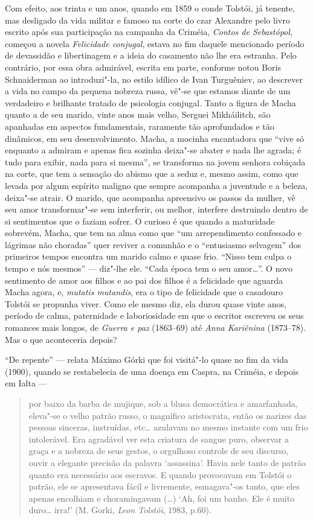 Com efeito, aos trinta e um anos, quando em 1859 o conde Tolstói,
já tenente, mas desligado da vida militar e famoso na corte do czar
Alexandre  pelo livro escrito após sua participação na campanha da
Criméia, \emph{Contos de Sebastópol}, começou a novela \emph{Felicidade
conjugal}, estava no fim daquele mencionado período de devassidão e
libertinagem e a ideia do casamento não lhe era estranha. Pelo
contrário, por essa obra admirável, escrita em parte, conforme notou
Boris Schnaiderman ao introduzi"-la, no estilo idílico de Ivan Turguêniev,
ao descrever a vida no campo da pequena nobreza russa, vê"-se que estamos
diante de um verdadeiro e brilhante tratado de psicologia conjugal.
Tanto a figura de Macha quanto a de seu marido, vinte anos mais velho,
Serguei Mikháilitch, são apanhadas em aspectos fundamentais,
raramente tão aprofundados e tão dinâmicos, em seu desenvolvimento.
Macha, a mocinha encantadora que ``vive só enquanto a admiram e apenas
fica sozinha deixa"-se abater e nada lhe agrada; é tudo para exibir, nada
para si mesma'', se transforma na jovem senhora cobiçada na corte, que
tem a sensação do abismo que a seduz e, mesmo assim, como que levada
por algum espírito maligno que sempre acompanha a juventude e a beleza,
deixa"-se atrair. O marido, que acompanha apreensivo os passos da mulher,
vê seu amor transformar"-se sem interferir, ou melhor, interfere
destruindo dentro de si sentimentos que o faziam sofrer. O curioso é que
quando a maturidade sobrevém, Macha, que tem na alma como que ``um
arrependimento confessado e lágrimas não choradas'' quer reviver a
comunhão e o ``entusiasmo selvagem'' dos primeiros
tempos encontra um marido calmo e quase frio. ``Nisso tem culpa o
tempo e nós mesmos'' --- diz"-lhe ele. ``Cada época tem o seu amor\ldots{}''. O
novo sentimento de amor aos filhos e ao pai dos filhos é a
felicidade que aguarda Macha agora, e, \emph{mutatis mutandis}, era o
tipo de felicidade que o casadouro Tolstói se propunha viver. Como ele
mesmo diz, ela durou quase vinte anos, período de calma, paternidade e
laboriosidade em que o escritor escreveu os seus romances mais longos,
de \emph{Guerra e paz} (1863--69) até \emph{Anna Kariênina} (1873--78).
Mas o que aconteceria depois?

``De repente'' --- relata Máximo Górki que foi visitá"-lo quase no fim
da vida (1900)\emph{,} quando se restabelecia de uma doença em Caspra,
na Criméia, e depois em Ialta ---

\begin{quote}
por baixo da barba de
mujique, sob a blusa democrática e amarfanhada, eleva"-se o velho patrão
russo, o magnífico aristocrata, então os narizes das pessoas sinceras,
instruídas, etc\ldots{} azulavam no mesmo instante com um frio intolerável.
Era agradável ver esta criatura de sangue puro, observar a graça e a
nobreza de seus gestos, o orgulhoso controle de seu discurso, ouvir a
elegante precisão da palavra `assassina'. Havia nele tanto de patrão
quanto era necessário aos escravos. E quando provocavam em Tolstói o
patrão, ele se apresentava fácil e livremente, esmagava"-os tanto, que
eles apenas encolhiam e choramingavam (\ldots{}) `Ah, foi um banho. Ele é
muito duro\ldots{} irra!' (M. Gorki, \emph{Leon Tolstói}, 1983, p.60).
\end{quote}

